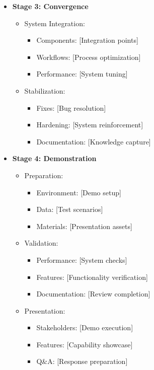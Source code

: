\documentclass{article}
\begin{document}
\begin{itemize}
\begin{itemize}
\begin{itemize}
        \end{itemize}
    \end{itemize}
    \item \textbf{Stage 3: Convergence}
    \begin{itemize}
        \item System Integration:
        \begin{itemize}
            \item Components: [Integration points]
            \item Workflows: [Process optimization]
            \item Performance: [System tuning]
        \end{itemize}
        \item Stabilization:
        \begin{itemize}
            \item Fixes: [Bug resolution]
            \item Hardening: [System reinforcement]
            \item Documentation: [Knowledge capture]
        \end{itemize}
    \end{itemize}
    \item \textbf{Stage 4: Demonstration}
    \begin{itemize}
        \item Preparation:
        \begin{itemize}
            \item Environment: [Demo setup]
            \item Data: [Test scenarios]
            \item Materials: [Presentation assets]
        \end{itemize}
        \item Validation:
        \begin{itemize}
            \item Performance: [System checks]
            \item Features: [Functionality verification]
            \item Documentation: [Review completion]
        \end{itemize}
        \item Presentation:
        \begin{itemize}
            \item Stakeholders: [Demo execution]
            \item Features: [Capability showcase]
            \item Q\&A: [Response preparation]
        \end{itemize}
    \end{itemize}
\end{itemize}
\end{document}

